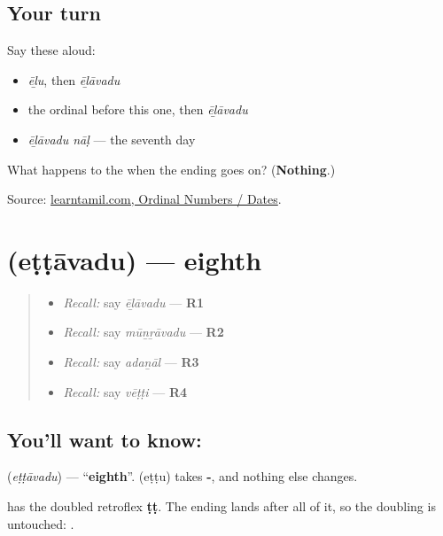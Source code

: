 \subsection*{Your turn}
Say these aloud:

\begin{itemize}
\raggedright
  \item \emph{ēḻu}, then \emph{ēḻāvadu}
  \item the ordinal before this one, then \emph{ēḻāvadu}
  \item \emph{ēḻāvadu nāḷ} — the seventh day
\end{itemize}

\begin{tcolorbox}[breakable,colback=teal!4,colframe=teal!35!black,title={Before you move on}]
What happens to the  when the ending goes on? (\textbf{Nothing}.)

Source: \href{https://www.learntamil.com/part1/ch02/ordinal-numbers-dates/}{learntamil.com, Ordinal Numbers / Dates}.
\end{tcolorbox}
\section[\texorpdfstring{\ta{எட்டாவது} (eṭṭāvadu)}{எட்டாவது (eṭṭāvadu)}]{ (eṭṭāvadu) — eighth}

\label{lesson:TA-C83-eighth}



\begin{quote}
\begin{itemize}
\raggedright
  \item \emph{Recall:} say \emph{ēḻāvadu} — \textbf{R1}
  \item \emph{Recall:} say \emph{mūṉṟāvadu} — \textbf{R2}
  \item \emph{Recall:} say \emph{adaṉāl} — \textbf{R3}
  \item \emph{Recall:} say \emph{vēṭṭi} — \textbf{R4}
\end{itemize}
\end{quote}

\subsection*{You'll want to know: }
\textbf{} (\emph{eṭṭāvadu}) — \textquotedblleft{}\textbf{eighth}\textquotedblright{}. \textbf{} (eṭṭu) takes \textbf{-}, and nothing else changes.

\textbf{} has the doubled retroflex \textbf{ṭṭ}. The ending lands after all of it, so the doubling is untouched: \textbf{}.

